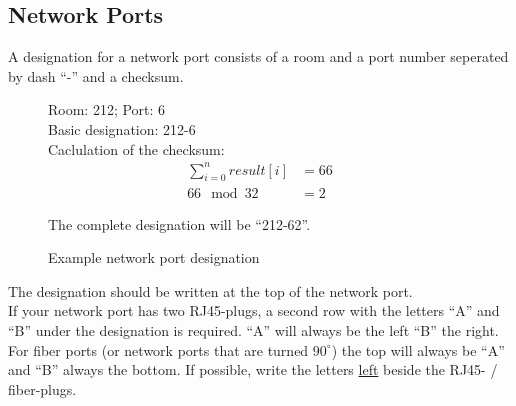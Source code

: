 %
%
%
%
%
%
%

\subsection{Network Ports}

A designation for a network port consists of a room and a port number seperated
by dash ``-'' and a checksum.

\begin{figure}[H]
	Room: 212; Port: 6 \\
	Basic designation: 212-6 \\

	Caclulation of the checksum:
	\begin{align*}
		\sum_{i=0}^{n} result[i] &= 66 \\
		66 \mod 32 &= 2
	\end{align*}

	The complete designation will be ``212-62''.

	\caption{Example network port designation}
\end{figure}

The designation should be written at the top of the network port. \\


If your network port has two RJ45-plugs, a second row with the letters ``A'' and
``B'' under the designation is required. ``A'' will always be the left ``B'' the
right.
For fiber ports (or network ports that are turned $90^{\circ}$) the top will
always be ``A'' and ``B'' always the bottom. If possible, write the letters
\underline{left} beside the RJ45- / fiber-plugs.


